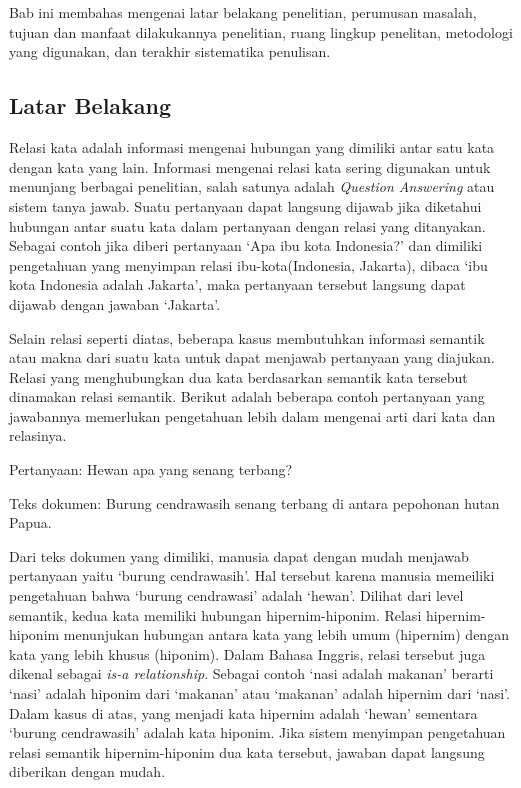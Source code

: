 \chapter{\babSatu}
Bab ini membahas mengenai latar belakang penelitian, perumusan masalah, tujuan dan manfaat dilakukannya penelitian, ruang lingkup penelitan, metodologi yang digunakan, dan terakhir sistematika penulisan. 

%
\section{Latar Belakang}
Relasi kata adalah informasi mengenai hubungan yang dimiliki antar satu kata dengan kata yang lain. Informasi mengenai relasi kata sering digunakan untuk menunjang berbagai penelitian, salah satunya adalah \textit{Question Answering} atau sistem tanya jawab. Suatu pertanyaan dapat langsung dijawab jika diketahui hubungan antar suatu kata dalam pertanyaan dengan relasi yang ditanyakan. Sebagai contoh jika diberi pertanyaan `Apa ibu kota Indonesia?' dan dimiliki pengetahuan yang menyimpan relasi ibu-kota(Indonesia, Jakarta), dibaca `ibu kota Indonesia adalah Jakarta', maka pertanyaan tersebut langsung dapat dijawab dengan jawaban `Jakarta'.

Selain relasi seperti diatas, beberapa kasus membutuhkan informasi semantik atau makna dari suatu kata untuk dapat menjawab pertanyaan yang diajukan. Relasi yang menghubungkan dua kata berdasarkan semantik kata tersebut dinamakan relasi semantik. Berikut adalah beberapa contoh pertanyaan yang jawabannya memerlukan pengetahuan lebih dalam mengenai arti dari kata dan relasinya.

Pertanyaan: Hewan apa yang senang terbang?

Teks dokumen: Burung cendrawasih senang terbang di antara pepohonan hutan Papua.

Dari teks dokumen yang dimiliki, manusia dapat dengan mudah menjawab pertanyaan yaitu `burung cendrawasih'. Hal tersebut karena manusia memeiliki pengetahuan bahwa `burung cendrawasi' adalah `hewan'. Dilihat dari level semantik, kedua kata memiliki hubungan hipernim-hiponim. Relasi hipernim-hiponim menunjukan hubungan antara kata yang lebih umum (hipernim) dengan kata yang lebih khusus (hiponim). Dalam Bahasa Inggris, relasi tersebut juga dikenal sebagai \textit{is-a relationship}. Sebagai contoh `nasi adalah makanan' berarti `nasi' adalah hiponim dari `makanan' atau `makanan' adalah hipernim dari `nasi'. Dalam kasus di atas, yang menjadi kata hipernim adalah `hewan' sementara `burung cendrawasih' adalah kata hiponim. Jika sistem menyimpan pengetahuan relasi semantik hipernim-hiponim dua kata tersebut, jawaban dapat langsung diberikan dengan mudah.

